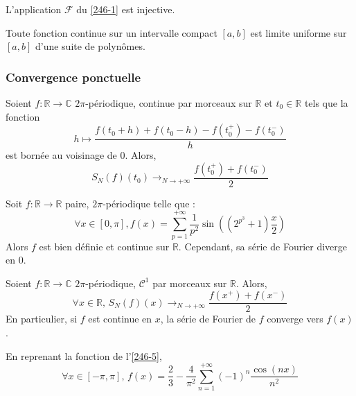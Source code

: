   \begin{application}
    L'application $\mathcal{F}$ du \cref{246-1} est injective.
  \end{application}


  \begin{application}
    Toute fonction continue sur un intervalle compact $[a,b]$ est limite uniforme sur $[a,b]$ d'une suite de polynômes.
  \end{application}

  \subsubsection{Convergence ponctuelle}


  \begin{theorem}[Dirichlet]
    Soient $f : \mathbb{R} \rightarrow \mathbb{C}$ $2\pi$-périodique, continue par morceaux sur $\mathbb{R}$ et $t_0 \in \mathbb{R}$ tels que la fonction
    \[ h \mapsto \frac{f(t_0 + h) + f(t_0 - h) - f(t_0^+) - f(t_0^-)}{h} \]
    est bornée au voisinage de $0$. Alors,
    \[ S_N(f)(t_0) \longrightarrow_{N \rightarrow +\infty} \frac{f(t_0^+) + f(t_0^-)}{2} \]
  \end{theorem}

  \begin{cexample}
    Soit $f : \mathbb{R} \rightarrow \mathbb{R}$ paire, $2\pi$-périodique telle que :
    \[ \forall x \in [0, \pi], f(x) = \sum_{p=1}^{+\infty} \frac{1}{p^2} \sin \left( (2^{p^3} + 1) \frac{x}{2} \right)
    \]
    Alors $f$ est bien définie et continue sur $\mathbb{R}$. Cependant, sa série de Fourier diverge en $0$.
  \end{cexample}

  \begin{corollary}
    Soient $f : \mathbb{R} \rightarrow \mathbb{C}$ $2\pi$-périodique, $\mathcal{C}^1$ par morceaux sur $\mathbb{R}$. Alors,
    \[ \forall x \in \mathbb{R}, \, S_N(f)(x) \longrightarrow_{N \rightarrow +\infty} \frac{f(x^+) + f(x^-)}{2} \]
    En particulier, si $f$ est continue en $x$, la série de Fourier de $f$ converge vers $f(x)$.
  \end{corollary}

  \begin{example}
    \label{246-6}
    En reprenant la fonction de l'\cref{246-5},
    \[ \forall x \in [-\pi, \pi], \, f(x) = \frac{2}{3} - \frac{4}{\pi^2} \sum_{n=1}^{+\infty} (-1)^n \frac{\cos(nx)}{n^2} \]
  \end{example}

